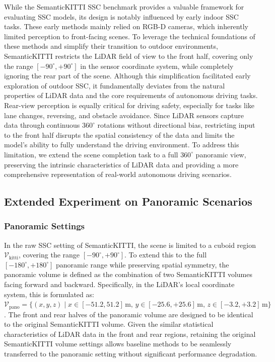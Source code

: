 \documentclass[conference]{IEEEtran}
\begin{document}
While the SemanticKITTI SSC benchmark provides a valuable framework for evaluating SSC models, its design is notably influenced by early indoor SSC tasks.
These early methods mainly relied on RGB-D cameras, which inherently limited perception to front-facing scenes.
To leverage the technical foundations of these methods and simplify their transition to outdoor environments, SemanticKITTI restricts the LiDAR field of view to the front half, covering only the range $[-90^\circ, +90^\circ]$ in the sensor coordinate system, while completely ignoring the rear part of the scene.
Although this simplification facilitated early exploration of outdoor SSC, it fundamentally deviates from the natural properties of LiDAR data and the core requirements of autonomous driving tasks.
Rear-view perception is equally critical for driving safety, especially for tasks like lane changes, reversing, and obstacle avoidance.
Since LiDAR sensors capture data through continuous $360^\circ$ rotations without directional bias, restricting input to the front half disrupts the spatial consistency of the data and limits the model's ability to fully understand the driving environment.
To address this limitation, we extend the scene completion task to a full $360^\circ$ panoramic view, preserving the intrinsic characteristics of LiDAR data and providing a more comprehensive representation of real-world autonomous driving scenarios.

\subsection{Extended Experiment on Panoramic Scenarios}

\subsubsection{Panoramic Settings}

In the raw SSC setting of SemanticKITTI, the scene is limited to a cuboid region $\mathcal{V}_\mathrm{kitti}$, covering the range $[-90^\circ, +90^\circ]$.
To extend this to the full $[-180^\circ, +180^\circ]$ panoramic range while preserving spatial symmetry, the panoramic volume is defined as the combination of two SemanticKITTI volumes facing forward and backward.
Specifically, in the LiDAR's local coordinate system, this is formulated as:
$\mathcal{V}_\mathrm{pano} = \{(x,y,z) \mid x \in [-51.2, 51.2]\,\text{m},\, y \in [-25.6, +25.6]\,\text{m},\, z \in [-3.2, +3.2]\,\text{m}\}$.
The front and rear halves of the panoramic volume are designed to be identical to the original SemanticKITTI volume.
Given the similar statistical characteristics of LiDAR data in the front and rear regions, retaining the original SemanticKITTI volume settings allows baseline methods to be seamlessly transferred to the panoramic setting without significant performance degradation.
\end{document}
